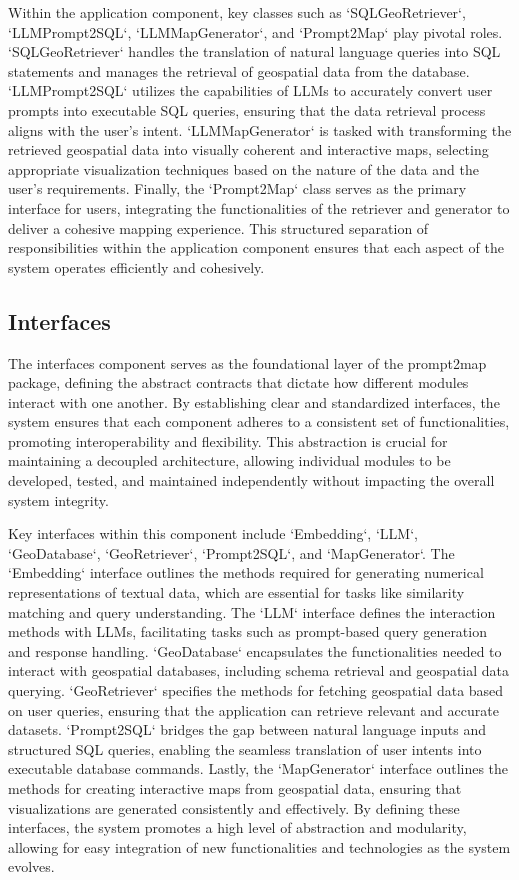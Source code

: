 Within the application component, key classes such as `SQLGeoRetriever`, `LLMPrompt2SQL`, `LLMMapGenerator`, and `Prompt2Map` play pivotal roles. `SQLGeoRetriever` handles the translation of natural language queries into SQL statements and manages the retrieval of geospatial data from the database. `LLMPrompt2SQL` utilizes the capabilities of LLMs to accurately convert user prompts into executable SQL queries, ensuring that the data retrieval process aligns with the user's intent. `LLMMapGenerator` is tasked with transforming the retrieved geospatial data into visually coherent and interactive maps, selecting appropriate visualization techniques based on the nature of the data and the user's requirements. Finally, the `Prompt2Map` class serves as the primary interface for users, integrating the functionalities of the retriever and generator to deliver a cohesive mapping experience. This structured separation of responsibilities within the application component ensures that each aspect of the system operates efficiently and cohesively.

\subsection{Interfaces}
The interfaces component serves as the foundational layer of the prompt2map package, defining the abstract contracts that dictate how different modules interact with one another. By establishing clear and standardized interfaces, the system ensures that each component adheres to a consistent set of functionalities, promoting interoperability and flexibility. This abstraction is crucial for maintaining a decoupled architecture, allowing individual modules to be developed, tested, and maintained independently without impacting the overall system integrity.

Key interfaces within this component include `Embedding`, `LLM`, `GeoDatabase`, `GeoRetriever`, `Prompt2SQL`, and `MapGenerator`. The `Embedding` interface outlines the methods required for generating numerical representations of textual data, which are essential for tasks like similarity matching and query understanding. The `LLM` interface defines the interaction methods with LLMs, facilitating tasks such as prompt-based query generation and response handling. `GeoDatabase` encapsulates the functionalities needed to interact with geospatial databases, including schema retrieval and geospatial data querying. `GeoRetriever` specifies the methods for fetching geospatial data based on user queries, ensuring that the application can retrieve relevant and accurate datasets. `Prompt2SQL` bridges the gap between natural language inputs and structured SQL queries, enabling the seamless translation of user intents into executable database commands. Lastly, the `MapGenerator` interface outlines the methods for creating interactive maps from geospatial data, ensuring that visualizations are generated consistently and effectively. By defining these interfaces, the system promotes a high level of abstraction and modularity, allowing for easy integration of new functionalities and technologies as the system evolves.

